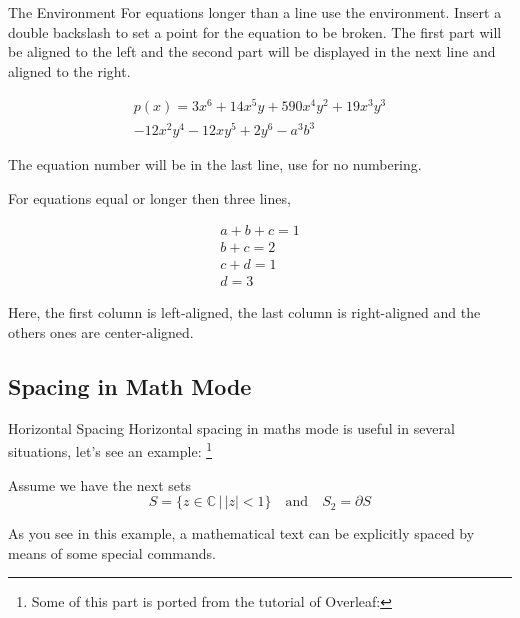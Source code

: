 \begin{frame}[fragile]{The  Environment}
For equations longer than a line use the  environment. Insert a double backslash to set a point for the equation to be broken. The first part will be aligned to the left and the second part will be displayed in the next line and aligned to the right.

\begin{latexexample}
\begin{multline}
  p(x) = 3x^6 + 14x^5y + 590x^4y^2 + 19x^3y^3 \\ 
         - 12x^2y^4 - 12xy^5 + 2y^6 - a^3b^3
\end{multline}
\end{latexexample}

The equation number will be in the last line, use  for no numbering.

\end{frame}

\begin{frame}[fragile]

For equations equal or longer then three lines,

\begin{latexexample}
\begin{multline*}
  a+b+c=1 \\ 
  b+c=2 \\
  c+d=1 \\
  d=3
\end{multline*}
\end{latexexample}

Here, the first column is left-aligned, the last column is right-aligned and the others ones are center-aligned. 

\end{frame}

\subsection{Spacing in Math Mode}

\begin{frame}[fragile]{Horizontal Spacing}
Horizontal spacing in maths mode is useful in several situations, let's see an example: \footnote[1]{Some of this part is ported from the tutorial of Overleaf: } \medskip

\begin{latexexample}
Assume we have the next sets
\[
S = \{ z \in \mathbb{C}\, |\, |z| < 1 \} \quad 
\textrm{and} \quad S_2=\partial{S}
\]
\end{latexexample}

As you see in this example, a mathematical text can be explicitly spaced by means of some special commands.

\end{frame}

